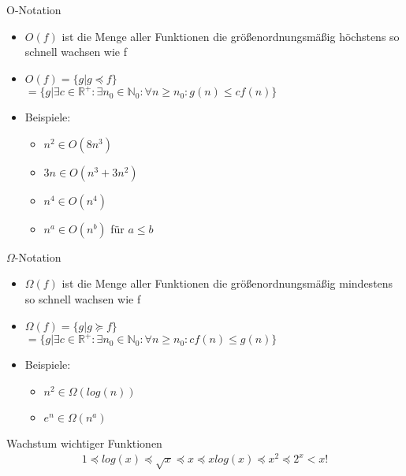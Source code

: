 \begin{frame}{O-Notation}
  \begin{itemize}
    \item $O(f)$ ist die Menge aller Funktionen die größenordnungsmäßig höchstens so schnell wachsen wie f
    \item $O(f)=\{g|g\preceq f\}$\\$=\{g|\exists c\in \mathbb{R}^+: \exists n_0\in \mathbb{N}_0: \forall n\geq n_0:g(n) \leq cf(n)\}$
    \item Beispiele:
      \begin{itemize}
        \item $n^2 \in O(8n^3)$
        \item $3n \in O(n^3+3n^2)$
        \item $n^4 \in O(n^4)$
        \item $n^a \in O(n^b)$ für $a\leq b$
      \end{itemize}
  \end{itemize}
\end{frame}

\begin{frame}{$\Omega$-Notation}
  \begin{itemize}
    \item $\Omega(f)$ ist die Menge aller Funktionen die größenordnungsmäßig mindestens so schnell wachsen wie f
    \item $\Omega (f)=\{g|g\succeq f\}$\\$=\{g|\exists c\in \mathbb{R}^+: \exists n_0\in \mathbb{N}_0: \forall n\geq n_0:cf(n)\leq g(n)\}$
    \item Beispiele:
      \begin{itemize}
        \item $n^2 \in \Omega(log(n))$
        \item $e^n \in \Omega(n^a)$
      \end{itemize}
  \end{itemize}
\end{frame}

\begin{frame}{Wachstum wichtiger Funktionen}
  \begin{align*}
    1 \preceq log(x) \preceq \sqrt{x} \preceq x \preceq xlog(x) \preceq x^2 \preceq 2^x < x!
  \end{align*}
\end{frame}

